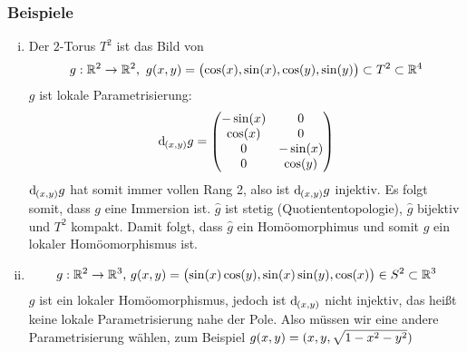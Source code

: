 \subsubsection[Beispiele zur lokalen Parametrisierung]{Beispiele}
\label{ssub:110}
\begin{enumerate}[(i)]
	\item Der $2$-Torus $T^2$ ist das Bild von
	\[
		g:\mathds{R}^2 \to \mathds{R}^2,\ g(x,y) = \enbrace[\big]{\cos(x),\sin(x),\cos(y),\sin(y)}\subset T^2 \subset \mathds{R}^4
	\]
	$g$ ist lokale Parametrisierung:
	\[
		\mathd_{(x,y)} g = 
		\begin{pmatrix}
		-\sin(x) & 0\\
		\cos(x) & 0\\
		0 & -\sin(x)\\
		0 & \cos(y)
		\end{pmatrix}
	\]
	$\mathd_{(x,y)} g$ hat somit immer vollen Rang 2, also ist $\mathd_{(x,y)} g$ injektiv. Es folgt somit, dass $g$ eine Immersion ist.
	$\hat{g}$ ist stetig (Quotiententopologie), $\hat{g}$ bijektiv und $T^2$ kompakt. Damit folgt, dass $\hat{g}$ ein Homöomorphimus und somit $g$ ein lokaler Homöomorphismus ist.
	\item 
	\[
		g:\mathds{R}^2 \to \mathds{R}^3\text{, } g(x,y) = \enbrace[\big]{\sin(x)\cos(y),\sin(x)\sin(y),\cos(x)} \in S^2\subset \mathds{R}^3
	\]
	$g$ ist ein lokaler Homöomorphismus, jedoch ist $\mathd_{(x,y)}$ nicht injektiv, das heißt keine lokale Parametrisierung nahe der Pole. Also müssen wir eine andere Parametrisierung wählen, zum Beispiel $g(x,y) = \enbrace{x,y,\sqrt{1-x^2-y^2}}$
\end{enumerate}

